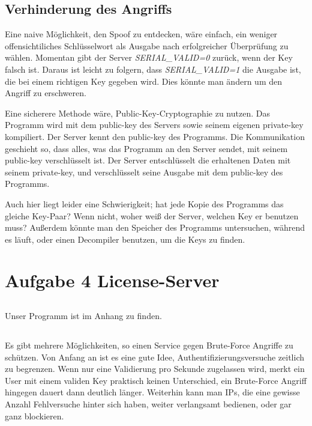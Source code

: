 \documentclass[10pt,a4paper]{article}
\begin{document}
\subsection{Verhinderung des Angriffs}
Eine naive Möglichkeit, den Spoof zu entdecken, wäre einfach, ein weniger offensichtiliches
Schlüsselwort als Ausgabe nach erfolgreicher Überprüfung zu wählen. Momentan gibt
der Server \textit{SERIAL\_VALID=0} zurück, wenn der Key falsch ist.
Daraus ist leicht zu folgern, dass \textit{SERIAL\_VALID=1} die Ausgabe ist, die
bei einem richtigen Key gegeben wird. Dies könnte man ändern um den Angriff
zu erschweren.

Eine sicherere Methode wäre, Public-Key-Cryptographie zu nutzen. Das Programm wird
mit dem public-key des Servers sowie seinem eigenen private-key kompiliert.
Der Server kennt den public-key des Programms. Die Kommunikation geschieht so,
dass alles, was das Programm an den Server sendet, mit seinem public-key verschlüsselt ist.
Der Server entschlüsselt die erhaltenen Daten mit seinem private-key, und
verschlüsselt seine Ausgabe mit dem public-key des Programms.

Auch hier liegt leider eine Schwierigkeit; hat jede Kopie des Programms das gleiche
Key-Paar? Wenn nicht, woher weiß der Server, welchen Key er benutzen muss?
Außerdem könnte man den Speicher des Programms untersuchen, während es läuft,
oder einen Decompiler benutzen, um die Keys zu finden.

\section{Aufgabe 4 License-Server}
\setcounter{subsection}{0}
\subsection{}
Unser Programm ist im Anhang zu finden.

\subsection{}
Es gibt mehrere Möglichkeiten, so einen Service gegen Brute-Force Angriffe zu schützen.
Von Anfang an ist es eine gute Idee, Authentifizierungsversuche zeitlich zu begrenzen.
Wenn nur eine Validierung pro Sekunde zugelassen wird, merkt ein User mit einem validen
Key praktisch keinen Unterschied, ein Brute-Force Angriff hingegen dauert dann deutlich länger.
Weiterhin kann man IPs, die eine gewisse Anzahl Fehlversuche hinter sich haben, weiter
verlangsamt bedienen, oder gar ganz blockieren.
\end{document}
